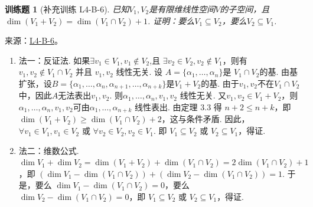 \documentclass[UTF8,12pt,a4paper,fontset=fandol]{ctexart}
\newtheorem{exercise}{训练题}[section]
\begin{document}
\begin{exercise}[补充训练 L4-B-6]\label{prob:L4-B-6}
已知$V_1,V_2$是有限维线性空间$V$的子空间，且$\dim(V_1+V_2)=\dim(V_1 \cap V_2)+1$. 证明：要么$V_1 \subseteq V_2$，要么$V_2 \subseteq V_1$.
\end{exercise}
\noindent 来源：\href{https://github.com/yhwu-is/Linear-Algebra-Left-Undone/blob/new/%E8%AE%B2%E4%B9%89/%E4%B8%93%E9%A2%98/4%20%E7%BA%BF%E6%80%A7%E7%A9%BA%E9%97%B4%E7%9A%84%E8%BF%90%E7%AE%97.tex}{L4-B-6}。
\begin{solve}
\begin{enumerate}
                \item 法一：反证法. 如果$\exists v_1\in V_1,v_1\not\in V_2$,且 $\exists v_2\in V_2,v_2\not\in V_1$，则有 $v_1,v_2\not \in V_1\cap V_2$ 并且 $v_1,v_2$ 线性无关. 设 $A=\{\alpha_1,\ldots ,\alpha_n\}$是 $V_1\cap V_2$的基. 由基扩张，设$B=\{\alpha_1,\ldots ,\alpha_n,\alpha_{n+1},\ldots ,\alpha_{n+k}\}$是$V_1+V_2$的基. 由于$v_1,v_2$不在$V_1\cap V_2$中，因此$A$无法表出$v_1,v_2$. 则$\alpha_1,\ldots ,\alpha_n,v_1,v_2$ 线性无关. 又$v_1,v_2\in V_1+V_2$，则$\alpha_1,\ldots ,\alpha_n,v_1,v_2$可由$\alpha_1,\ldots ,\alpha_{n+k}$ 线性表出. 由定理 $3.3$ 得 $n+2\leqslant n+k$，即 $\dim (V_1+V_2)\ge\dim (V_1\cap V_2)+2$，这与条件矛盾. 因此，$\forall v_1\in V_1,v_1\in V_2$ 或 $\forall v_2\in V_2,v_2\in V_1$. 即 $V_1\subseteq V_2$ 或 $V_2\subseteq V_1$，得证.

                \item 法二：维数公式. $\dim V_1+\dim V_2=\dim  (V_1+V_2)+\dim  (V_1\cap V_2)=2\dim  (V_1\cap V_2)+1$，即 $(\dim V_1-\dim  (V_1\cap V_2))+ (\dim V_2-\dim  (V_1\cap V_2))=1$. 于是，要么 $\dim V_1-\dim  (V_1\cap V_2)=0$，要么 $\dim V_2-\dim  (V_1\cap V_2)=0$，即 $V_1\subseteq V_2$ 或 $V_2\subseteq V_1$，得证.
            \end{enumerate}
\end{solve}
\end{document}
